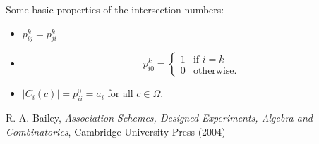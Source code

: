 \documentclass[12pt]{article}
\begin{document}
Some basic properties of the intersection numbers:
\begin{itemize}
\item $p_{ij}^k=p_{ji}^k$
\item 
\begin{displaymath}
p_{i0}^k = \left\{
\begin{array}{ll}
1 & \textrm{if }i=k\\
0 & \textrm{otherwise.}
\end{array}
\right.
\end{displaymath}
\item $|C_i(c)|=p_{ii}^0=a_i$ for all $c\in \Omega$.
\end{itemize}

\begin{thebibliography}{7}
 R. A. Bailey, {\it Association Schemes, Designed Experiments, Algebra and Combinatorics}, Cambridge University Press (2004)
\end{thebibliography}
\end{document}
